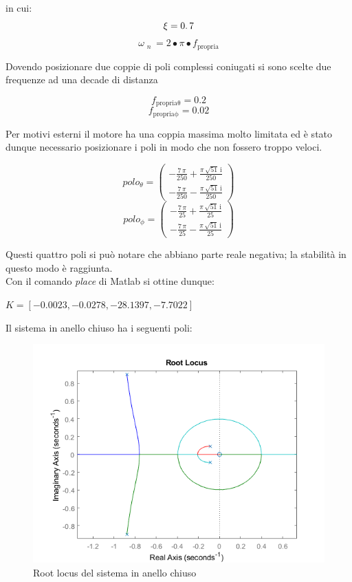 \begin{center}
	in cui:
	$$
	\xi =0\ldotp 7
	$$
	$$
	\omega {\;}_{n\;} =2\bullet \pi \bullet f_{\mathrm{propria}}
	$$
\end{center}Dovendo posizionare due coppie di poli complessi coniugati si sono scelte due frequenze ad una decade di distanza
\begin{center}
	
	$$
	f_{\mathrm{propria\theta}} =  0.2
	$$
	$$
	f_{\mathrm{propria\phi}} =  0.02
	$$
\end{center}Per motivi esterni il motore ha una coppia massima molto limitata ed è stato dunque necessario posizionare i poli in modo che non fossero troppo veloci.
\begin{center}
	
	$$
	polo_{\theta} = \left(\begin{array}{c}
	-\frac{7\,\pi }{250}+\frac{\pi \,\sqrt{51}\,\mathrm{i}}{250}\\
	-\frac{7\,\pi }{250}-\frac{\pi \,\sqrt{51}\,\mathrm{i}}{250}
	\end{array}\right)
	$$
	$$
	polo_{\phi} = \left(\begin{array}{c}
	-\frac{7\,\pi }{25}+\frac{\pi \,\sqrt{51}\,\mathrm{i}}{25}\\
	-\frac{7\,\pi }{25}-\frac{\pi \,\sqrt{51}\,\mathrm{i}}{25}
	\end{array}\right)
	$$
\end{center}	Questi quattro poli si può notare che abbiano parte reale negativa; la stabilità in questo modo è raggiunta.\\
Con il comando \textit{place} di Matlab si ottine dunque:
\begin{center}
	
	$	K =[  -0.0023  , -0.0278, -28.1397  , -7.7022]$
	
\end{center}
Il sistema in anello chiuso ha i seguenti poli:
\begin{figure}[H]
	\centering   	
	\includegraphics[width=1\textwidth]{Immagini/root_locus_closed_loop.png}
	\caption{Root locus del sistema in anello chiuso}
	\label{fig:closed_loop_root}
\end{figure}
